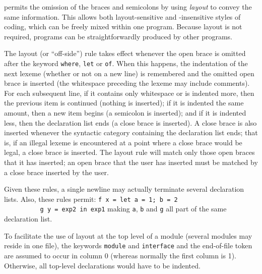 %
%

\Haskell{} permits the omission of the braces and semicolons by
using {\em layout} to convey the same information.  This allows both
layout-sensitive and -insensitive styles of coding, which
can be freely mixed within one program.  Because layout is
not required, \Haskell{} programs can be straightforwardly
produced by other programs.

The layout (or ``off-side'') rule takes effect whenever the
open brace is omitted after the keyword \mbox{\tt where}, \mbox{\tt let} or \mbox{\tt of}.
When this happens, the indentation of the next lexeme (whether or not
on a new line) is remembered and the omitted open brace is inserted
(the whitespace preceding the lexeme may include comments).
For each subsequent line, if it contains only whitespace or is
indented more, then the previous item is continued (nothing is
inserted); if it is indented the same amount, then a new item begins
(a semicolon is inserted); and if it is indented less, then the
declaration list ends (a close brace is inserted).  A close brace is
also inserted whenever the syntactic category containing the
declaration list ends; that is, if an illegal lexeme is encountered at a
point where a close brace would be legal, a close brace is inserted.
The layout rule will match only those open braces
that it has inserted; an
open brace that the user has inserted must be
matched by a close brace inserted by the user.

Given these rules, a single newline may actually terminate several
declaration lists.  Also, these rules permit:
\bprog
\mbox{\tt f\ x\ =\ let\ a\ =\ 1;\ b\ =\ 2\ }\\
\mbox{\tt \ \ \ \ \ \ \ \ \ \ g\ y\ =\ exp2\ in\ exp1}
\eprog
making \mbox{\tt a}, \mbox{\tt b} and \mbox{\tt g} all part of the same declaration
list.

To facilitate the use of layout at the top level of a module
(several modules may reside in one file), the keywords
\mbox{\tt module} and \mbox{\tt interface} and the end-of-file token are assumed to occur in column
0 (whereas normally the first column is 1).  Otherwise, all
top-level declarations would have to be indented.
